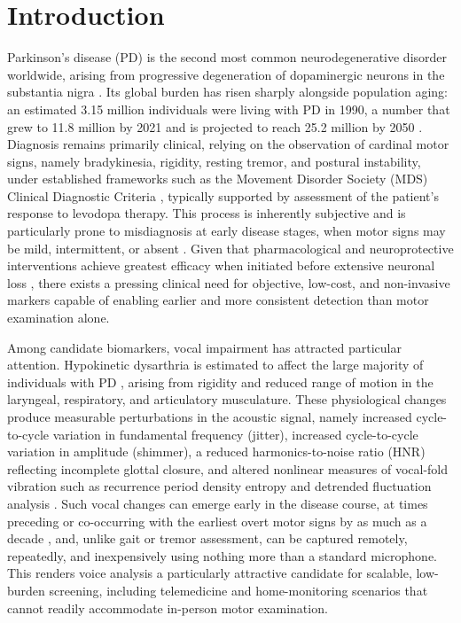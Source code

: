 \section{Introduction} \label{sec:1}
Parkinson's disease (PD) is the second most common neurodegenerative disorder worldwide, arising from progressive degeneration of dopaminergic neurons in the substantia nigra \cite{Kalia:2015}. Its global burden has risen sharply alongside population aging: an estimated 3.15 million individuals were living with PD in 1990, a number that grew to 11.8 million by 2021 and is projected to reach 25.2 million by 2050 \cite{GBD2016PDCollaborators:2018, Luo:2025}. Diagnosis remains primarily clinical, relying on the observation of cardinal motor signs, namely bradykinesia, rigidity, resting tremor, and postural instability, under established frameworks such as the Movement Disorder Society (MDS) Clinical Diagnostic Criteria \cite{Postuma:2015}, typically supported by assessment of the patient's response to levodopa therapy. This process is inherently subjective and is particularly prone to misdiagnosis at early disease stages, when motor signs may be mild, intermittent, or absent \cite{Rizzo:2016}. Given that pharmacological and neuroprotective interventions achieve greatest efficacy when initiated before extensive neuronal loss \cite{Frequin:2024}, there exists a pressing clinical need for objective, low-cost, and non-invasive markers capable of enabling earlier and more consistent detection than motor examination alone.

Among candidate biomarkers, vocal impairment has attracted particular attention. Hypokinetic dysarthria is estimated to affect the large majority of individuals with PD \cite{Ho:1999, Cao:2025}, arising from rigidity and reduced range of motion in the laryngeal, respiratory, and articulatory musculature. These physiological changes produce measurable perturbations in the acoustic signal, namely increased cycle-to-cycle variation in fundamental frequency (jitter), increased cycle-to-cycle variation in amplitude (shimmer), a reduced harmonics-to-noise ratio (HNR) reflecting incomplete glottal closure, and altered nonlinear measures of vocal-fold vibration such as recurrence period density entropy and detrended fluctuation analysis \cite{Yang:2020}. Such vocal changes can emerge early in the disease course, at times preceding or co-occurring with the earliest overt motor signs by as much as a decade \cite{Cao:2025}, and, unlike gait or tremor assessment, can be captured remotely, repeatedly, and inexpensively using nothing more than a standard microphone. This renders voice analysis a particularly attractive candidate for scalable, low-burden screening, including telemedicine and home-monitoring scenarios that cannot readily accommodate in-person motor examination.

